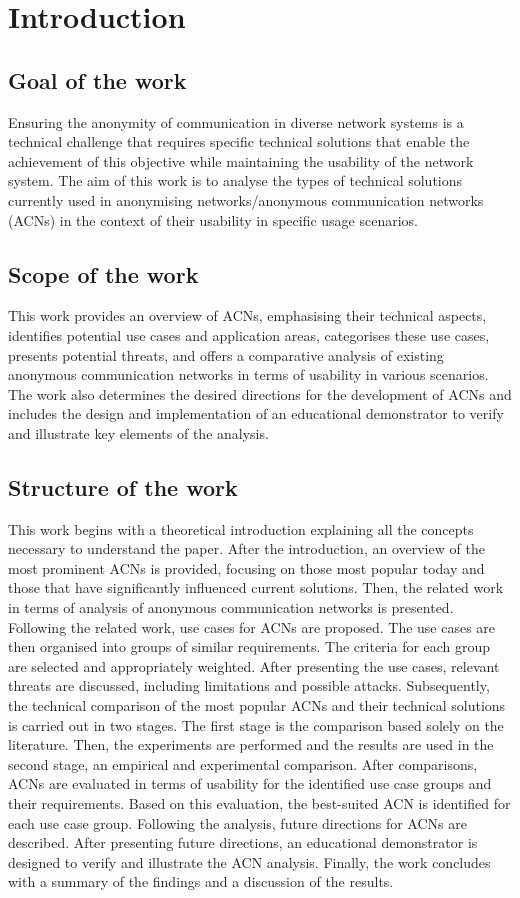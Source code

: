 \chapter{Introduction}

\section{Goal of the work}
Ensuring the anonymity of communication in diverse network systems is a technical challenge that requires specific technical solutions that enable the achievement of this objective while maintaining the usability of the network system. The aim of this work is to analyse the types of technical solutions currently used in anonymising networks/anonymous communication networks (ACNs) in the context of their usability in specific usage scenarios.

\section{Scope of the work}
This work provides an overview of ACNs, emphasising their technical aspects, identifies potential use cases and application areas, categorises these use cases, presents potential threats, and offers a comparative analysis of existing anonymous communication networks in terms of usability in various scenarios. The work also determines the desired directions for the development of ACNs and includes the design and implementation of an educational demonstrator to verify and illustrate key elements of the analysis.

\section{Structure of the work}
This work begins with a theoretical introduction explaining all the concepts necessary to understand the paper.
After the introduction, an overview of the most prominent ACNs is provided, focusing on those most popular today and those that have significantly influenced current solutions.
Then, the related work in terms of analysis of anonymous communication networks is presented.
Following the related work, use cases for ACNs are proposed. The use cases are then organised into groups of similar requirements. The criteria for each group are selected and appropriately weighted.
After presenting the use cases, relevant threats are discussed, including limitations and possible attacks.
Subsequently, the technical comparison of the most popular ACNs and their technical solutions is carried out in two stages. The first stage is the comparison based solely on the literature. Then, the experiments are performed and the results are used in the second stage, an empirical and experimental comparison.
After comparisons, ACNs are evaluated in terms of usability for the identified use case groups and their requirements. Based on this evaluation, the best-suited ACN is identified for each use case group.
Following the analysis, future directions for ACNs are described.
After presenting future directions, an educational demonstrator is designed to verify and illustrate the ACN analysis.
Finally, the work concludes with a summary of the findings and a discussion of the results.

